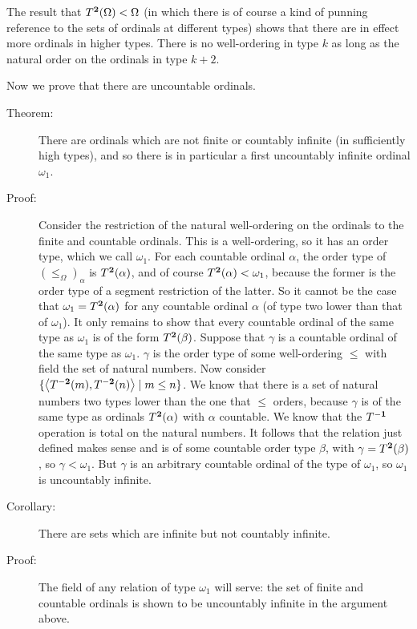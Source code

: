 \documentclass[12pt]{book}
\begin{document}
The result that $T^{\bf 2}(\Omega)<\Omega$ (in which there is of course a
kind of punning reference to the sets of ordinals at different types)
shows that there are in effect more ordinals in higher types.
There is no well-ordering in type $k$ as long as the natural order on
the ordinals in type $k+2$.

Now we prove that there are uncountable ordinals.

\begin{description}

\item[Theorem:] There are ordinals which are not finite or countably
infinite (in sufficiently high types), and so there is in particular a
first uncountably infinite ordinal $\omega_1$.

\item[Proof:] Consider the restriction of the natural well-ordering on
the ordinals to the finite and countable ordinals.  This is a
well-ordering, so it has an order type, which we call $\omega_1$.  For
each countable ordinal $\alpha$, the order type of
$(\leq_{\Omega})_{\alpha}$ is $T^{\bf 2}(\alpha)$, and of course
$T^{\bf 2}(\alpha) < \omega_1$, because the former is the order type of a
segment restriction of the latter.  So it cannot be the case that
$\omega_1 = T^{\bf 2}(\alpha)$ for any countable ordinal $\alpha$ (of type
two lower than that of $\omega_1$).  It only remains to show that
every countable ordinal of the same type as $\omega_1$ is of the form
$T^{\bf 2}(\beta)$.  Suppose that $\gamma$ is a countable ordinal of the
same type as $\omega_1$.  $\gamma$ is the order type of some
well-ordering $\leq$ with field the set of natural numbers.  Now
consider $\{\left<T^{\bf -2}(m),T^{\bf -2}(n)\right> \mid m \leq n\}$.  We
know that there is a set of natural numbers two types lower than the
one that $\leq$ orders, because $\gamma$ is of the same type as
ordinals $T^{\bf 2}(\alpha)$ with $\alpha$ countable.  We know that the
$T^{\bf -1}$ operation is total on the natural numbers.  It follows that
the relation just defined makes sense and is of some countable order
type $\beta$, with $\gamma=T^{\bf 2}(\beta)$, so $\gamma<\omega_1$.  But
$\gamma$ is an arbitrary countable ordinal of the type of $\omega_1$,
so $\omega_1$ is uncountably infinite.

\item[Corollary:] There are sets which are infinite but not countably
infinite.

\item[Proof:] The field of any relation of type $\omega_1$ will serve:
the set of finite and countable ordinals is shown to be uncountably
infinite in the argument above.

\end{description}
\end{document}
